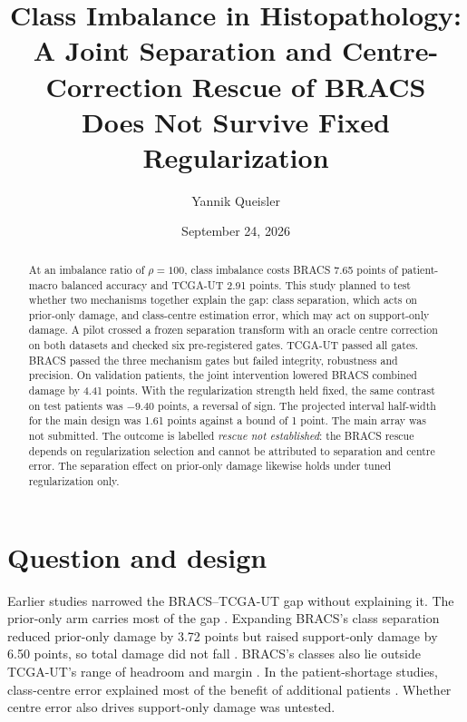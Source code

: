\documentclass[11pt]{article}
\title{Class Imbalance in Histopathology:\\A Joint Separation and Centre-Correction Rescue of {BRACS}\\Does Not Survive Fixed Regularization}
\author{Yannik Queisler}
\date{September 24, 2026}
\begin{document}
\raggedbottom
{}
\setlength{\emergencystretch}{2em}
\maketitle
\begin{abstract}
\noindent At an imbalance ratio of $\rho=100$, class imbalance costs BRACS 7.65 points of patient-macro balanced accuracy and TCGA-UT 2.91 points. This study planned to test whether two mechanisms together explain the gap: class separation, which acts on prior-only damage, and class-centre estimation error, which may act on support-only damage. A pilot crossed a frozen separation transform with an oracle centre correction on both datasets and checked six pre-registered gates. TCGA-UT passed all gates. BRACS passed the three mechanism gates but failed integrity, robustness and precision. On validation patients, the joint intervention lowered BRACS combined damage by 4.41 points. With the regularization strength held fixed, the same contrast on test patients was $-9.40$ points, a reversal of sign. The projected interval half-width for the main design was 1.61 points against a bound of 1 point. The main array was not submitted. The outcome is labelled \emph{rescue not established}: the BRACS rescue depends on regularization selection and cannot be attributed to separation and centre error. The separation effect on prior-only damage likewise holds under tuned regularization only.
\end{abstract}

\section{Question and design}
\label{sec:design}
Earlier studies narrowed the BRACS--TCGA-UT gap without explaining it. The prior-only arm carries most of the gap \citep{queisler2026causeTcga, queisler2026causeBracs}. Expanding BRACS's class separation reduced prior-only damage by 3.72 points but raised support-only damage by 6.50 points, so total damage did not fall \citep{queisler2026separationTcgaBracs}. BRACS's classes also lie outside TCGA-UT's range of headroom and margin \citep{queisler2026classProperties}. In the patient-shortage studies, class-centre error explained most of the benefit of additional patients \citep{queisler2026centreError}. Whether centre error also drives support-only damage was untested.
\end{document}
